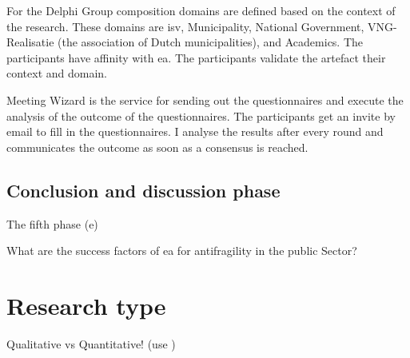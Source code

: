 For the Delphi Group composition domains are defined based on the context of the research. These domains are \acrfull{isv}, Municipality, National Government, VNG-Realisatie (the association of Dutch municipalities), and Academics. The participants have affinity with \acrshort{ea}. The participants validate the artefact their context and domain.

Meeting Wizard is the service for sending out the questionnaires and execute the analysis of the outcome of the questionnaires. The participants get an invite by email to fill in the questionnaires. I analyse the results after every round and communicates the outcome as soon as a consensus is reached.

\subsection{Conclusion and discussion phase}
\label{sub:conclusionanddiscussinophase}
The fifth phase (e)

What are the success factors of \acrlong{ea} for \gls{antifragility} in the public Sector?

\section{Research type}

\begin{remark}
	Qualitative vs Quantitative! (use \parencite{Recker2013})
\end{remark}


